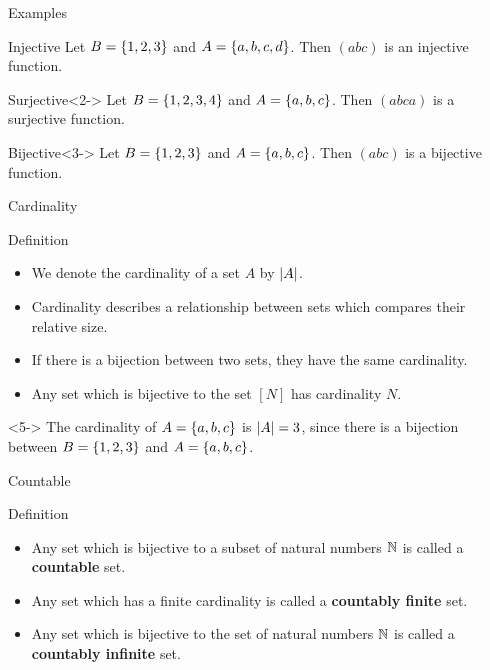 \documentclass[12pt,aspectratio=169]{beamer}
\begin{document}
\begin{frame}{Examples}
    \begin{block}{Injective}
        Let $B = \left\{1,2,3\right\}$ and $A = \left\{a,b,c,d\right\}$. Then $(abc)$ is an injective function.   
    \end{block}
    \begin{block}{Surjective}<2->
        Let $B = \left\{1,2,3,4\right\}$ and $A = \left\{a,b,c\right\}$. Then $(abca)$ is a surjective function.
    \end{block}
    \begin{block}{Bijective}<3->
            Let $B = \left\{1,2,3\right\}$ and $A = \left\{a,b,c\right\}$. Then $(abc)$ is a bijective function.    
    \end{block}   
\end{frame}

\begin{frame}{Cardinality}
    \begin{block}{Definition}
        \begin{itemize}
            \item We denote the cardinality of a set $A$ by $\left\lvert A\right\rvert$.
            \item<2->Cardinality describes a relationship between sets which compares their relative size.
            \item<3->If there is a bijection between two sets, they have the same cardinality.\\
            \item<4->Any set which is bijective to the set $[N]$ has cardinality $N$.
        \end{itemize}
    \end{block}

    \begin{Example}<5->
        The cardinality of $A = \left\{a,b,c\right\}$ is $\left\lvert A\right\rvert = 3$, since there is a bijection between $B = \left\{1,2,3\right\}$ and $A = \left\{a,b,c\right\}$.  
    \end{Example}
\end{frame}

\begin{frame}{Countable}
    \begin{block}{Definition}
        \begin{itemize}
            \item<1-> Any set which is bijective to a subset of natural numbers $\mathbb{N}$ is called a \textbf{countable} set.
            \item<2->Any set which has a finite cardinality is called a \textbf{countably finite} set.
            \item<3->Any set which is bijective to the set of natural numbers $\mathbb{N}$ is called a \textbf{countably infinite} set.
        \end{itemize}
    \end{block}
\end{frame}
\end{document}

